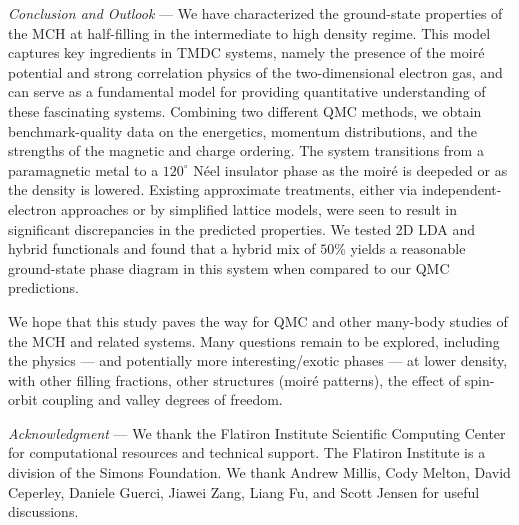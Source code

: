 \documentclass[aps,prb,showpacs,preprintnumbers,amsmath,amssymb,superscriptaddress,twocolumn]{revtex4-1}
\newcommand{\ssec}[1]{\emph{#1} ---}
\begin{document}
\ssec{Conclusion and Outlook}
We
have characterized the ground-state properties of the MCH
at half-filling in the intermediate to high density regime.
This model captures key ingredients in TMDC systems, namely the presence
of the moir\'e potential and
strong correlation physics of the two-dimensional electron gas,
and
can serve as a fundamental model for providing quantitative understanding of these fascinating systems.
Combining two different QMC methods, we obtain benchmark-quality data on the energetics,
momentum distributions, and the strengths of the magnetic
and charge ordering. The system transitions from a
paramagnetic metal to
a $120^\circ$ N\'eel insulator phase as the moir\'e is deepeded or as the density is lowered.
Existing approximate treatments, either via independent-electron approaches or by
simplified lattice models, were seen to result in significant discrepancies in the predicted properties. We tested 2D LDA and hybrid functionals and found that a
hybrid mix of $50$\%
yields a reasonable ground-state phase diagram
in this system
when compared to our
QMC predictions.

We hope that this study paves the way for QMC and other many-body studies of the MCH and
related systems. Many questions remain to be explored, including the physics ---
and potentially more interesting/exotic phases --- at lower
density, with other filling fractions, other structures (moir\'e patterns),
the effect
of spin-orbit coupling and valley degrees of freedom.

\ssec{Acknowledgment}
We thank the Flatiron Institute Scientific Computing Center for computational resources and technical support. The Flatiron Institute is a division of the Simons Foundation.
We thank Andrew Millis, Cody Melton, David Ceperley, Daniele Guerci, Jiawei Zang, Liang Fu, and Scott Jensen for useful discussions.



\end{document}
